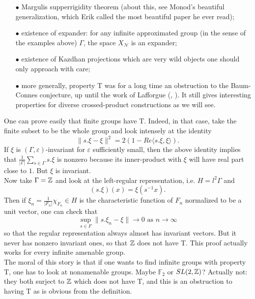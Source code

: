 \begin{itemize}
\item[$\bullet$] Margulis supperrigidity theorem (about this, see Monod's \cite{MonodSuperrigidity} beautiful generalization, which Erik called the most beautiful paper he ever read);\\
\item[$\bullet$] existence of expander: for any infinite approximated group (in the sense of the examples above) $\Gamma$, the space $X_\mathcal{N}$ is an expander;\\
\item[$\bullet$] existence of Kazdhan projections which are very wild objects one should only approach with care; \\
\item[$\bullet$] more generally, property T was for a long time an obstruction to the Baum-Connes conjecture, up until the work of Lafforgue (\cite{LafforgueHyperbolic}, \cite{Lafforgue}). It still gives interesting properties for diverse crossed-product constructions as we will see.\\ 
\end{itemize}

One can prove easily that finite groups have T. Indeed, in that case, take the finite subset to be the whole group and look intensely at the identity
\[ \| s.\xi - \xi \|^2 = 2 ( 1 - Re \langle s.\xi ,\xi \rangle ).  \]
If $\xi$ is $(\Gamma,\varepsilon)$-invariant for $\varepsilon$ sufficiently small, then the above identity implies that $\frac{1}{|\Gamma |} \sum_{s\in \Gamma} s.\xi $ is nonzero because its inner-product with $\xi$ will have real part close to $1$. But $\xi$ is invariant.\\

Now take $\Gamma = \mathbb Z$ and look at the left-regular representation, i.e. $H = l^2\Gamma$ and 
\[(s.\xi)(x) = \xi(s^{-1}x).\]
Then if $\xi_n = \frac{1}{|F_n|} \chi_{F_n}\in H$ is the characteristic function of $F_n$ normalized to be a unit vector, one can check that 
\[ \sup_{s\in F}\| s.\xi_n - \xi  \| \rightarrow 0 \text{ as }n\rightarrow \infty \]
so that the regular representation always almost has invariant vectors. But it never has nonzero invariant ones, so that $\mathbb Z$ does not have T. This proof actually works for every infinite amenable group. \\

The moral of this story is that if one wants to find infinite groups with property T, one has to look at nonamenable groups. Maybe $\mathbb F_2$ or $SL(2,\mathbb Z)$? Actually not: they both surject to $\mathbb Z$ which does not have T, and this is an obstruction to having T as is obvious from the definition.\\

